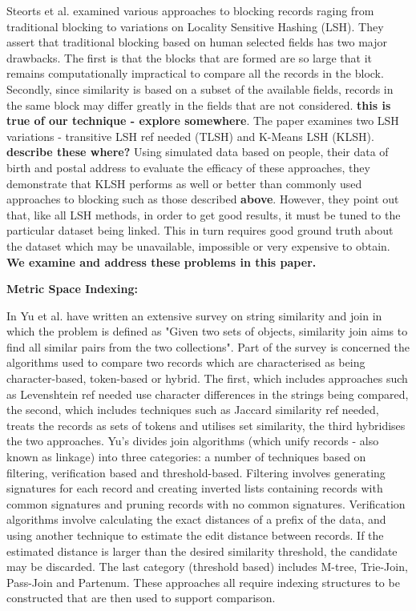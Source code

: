 \documentclass{llncs}
\begin{document}
Steorts et al. \cite{Steorts2014} examined various approaches to blocking records raging from traditional blocking to variations on Locality Sensitive Hashing (LSH). They assert that traditional blocking based on human selected fields has two major drawbacks. The first is that the blocks that are formed are so large that it remains computationally impractical to compare all the records in the block. Secondly, since similarity is based on a subset of the available fields, records in the same block may differ greatly in the fields that are not considered. \textbf{{this is true of our technique - explore somewhere}}. The paper examines two LSH variations - transitive LSH {ref needed} (TLSH) and K-Means LSH (KLSH). {\textbf{describe these where?}} 
Using simulated data based on people, their data of birth and postal address to evaluate the efficacy of these approaches, they demonstrate that KLSH performs as well or better than commonly used approaches to blocking such as those described \textbf{above}. However, they point out that, like all LSH methods, in order to get good results, it must be tuned to the particular dataset being linked. This in turn requires good ground truth about the dataset which may be unavailable, impossible or very expensive to obtain. \textbf{We examine and address these problems in this paper.}

\fi


\smallskip
\textbf{Metric Space Indexing:}



In \cite{Yu2016} Yu et al. have written an extensive survey on string similarity and join in which the problem is defined as "Given two sets of objects, similarity join aims to find all similar pairs from the two collections". Part of the survey is concerned the  algorithms used to compare two records which are characterised as being character-based, token-based or hybrid. The first, which includes approaches such as Levenshtein {ref needed} use character differences in the strings being compared, the second, which includes techniques such as Jaccard similarity {ref needed}, treats the records as sets of tokens and utilises set similarity, the third hybridises the two approaches. Yu's divides join algorithms (which unify records - also known as linkage) into three categories: a number of techniques based on filtering, verification based and threshold-based. Filtering involves generating signatures for each record and creating inverted lists containing records with common signatures and pruning records with no common signatures. Verification algorithms involve calculating the exact distances of a prefix of the data, and using another technique to estimate the edit distance between records. If the estimated distance is larger than the desired similarity threshold, the candidate may be discarded. The last category (threshold based) includes M-tree, Trie-Join, Pass-Join and Partenum. These approaches all require indexing structures to be constructed that are then used to support comparison.  
\end{document}
